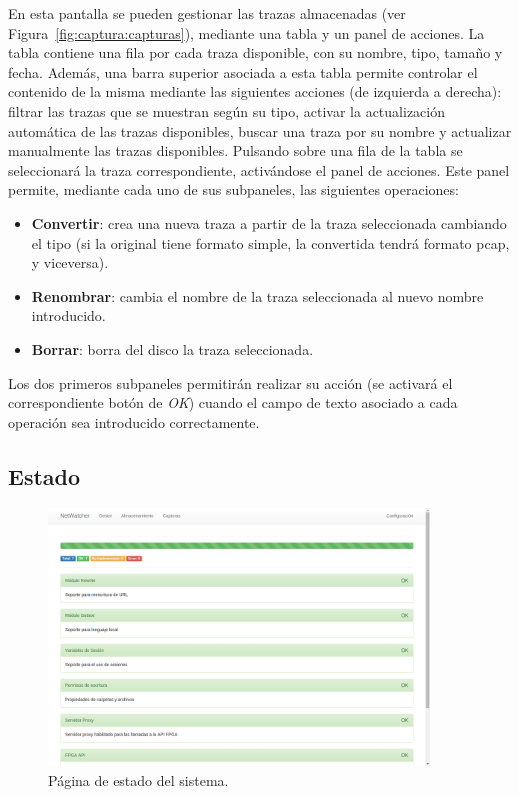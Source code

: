 En esta pantalla se pueden gestionar las \glspl{traza} almacenadas (ver Figura~\ref{fig:captura:capturas}), mediante una tabla y un panel de acciones.
La tabla contiene una fila por cada \gls{traza} disponible, con su nombre, tipo, tamaño y fecha.
Además, una barra superior asociada a esta tabla permite controlar el contenido de la misma mediante las siguientes acciones (de izquierda a derecha): filtrar las \glspl{traza} que se muestran según su tipo, activar la actualización automática de las \glspl{traza} disponibles, buscar una \gls{traza} por su nombre y actualizar manualmente las \glspl{traza} disponibles.
Pulsando sobre una fila de la tabla se seleccionará la \gls{traza} correspondiente, activándose el panel de acciones.
Este panel permite, mediante cada uno de sus subpaneles, las siguientes operaciones:
\begin{itemize}
  \item \textbf{Convertir}: crea una nueva \gls{traza} a partir de la \gls{traza} seleccionada cambiando el tipo (si la original tiene formato \gls{simple}, la convertida tendrá formato \gls{pcap}, y viceversa).
  \item \textbf{Renombrar}: cambia el nombre de la \gls{traza} seleccionada al nuevo nombre introducido.
  \item \textbf{Borrar}: borra del disco la \gls{traza} seleccionada.
\end{itemize}

Los dos primeros subpaneles permitirán realizar su acción (se activará el correspondiente botón de \textit{OK}) cuando el campo de texto asociado a cada operación sea introducido correctamente.


\subsection{Estado\label{extra:manual:estado}}

\begin{figure}[!htp]
  \centering
  \includegraphics[width=0.9\textwidth,clip=true]{graphics/capturas/estado}
  \caption{Página de estado del sistema.}
  \label{fig:captura:estado}
\end{figure}


